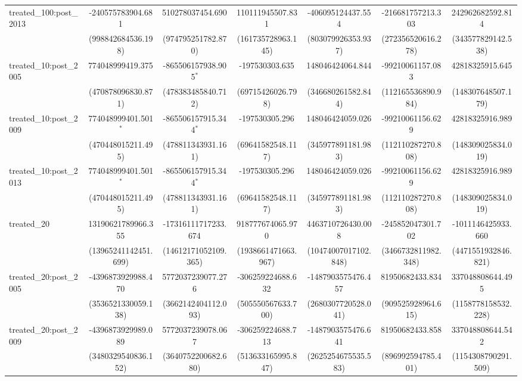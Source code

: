 \begin{table}[!htbp]
\begin{tabular}{@{\extracolsep{5pt}}lcccccc}
 treated_100:post_2013 & -240575783904.681$^{}$ & 510278037454.690$^{}$ & 110111945507.831$^{}$ & -406095124437.554$^{}$ & -216681757213.303$^{}$ & 242962682592.814$^{}$ \\
  & (998842684536.198) & (974795251782.870) & (161735728963.145) & (803079926353.937) & (272356520616.278) & (343577829142.538) \\
 treated_10:post_2005 & 774048999419.375$^{}$ & -865506157938.905$^{*}$ & -197530303.635$^{}$ & 148046424064.844$^{}$ & -99210061157.083$^{}$ & 42818325915.645$^{}$ \\
  & (470878096830.871) & (478383485840.712) & (69715426026.798) & (346680261582.844) & (112165536890.984) & (148307648507.179) \\
 treated_10:post_2009 & 774048999401.501$^{*}$ & -865506157915.344$^{*}$ & -197530305.296$^{}$ & 148046424059.026$^{}$ & -99210061156.629$^{}$ & 42818325916.989$^{}$ \\
  & (470448015211.495) & (478811343931.161) & (69641582548.117) & (345977891181.983) & (112110287270.808) & (148309025834.019) \\
 treated_10:post_2013 & 774048999401.501$^{*}$ & -865506157915.344$^{*}$ & -197530305.296$^{}$ & 148046424059.026$^{}$ & -99210061156.629$^{}$ & 42818325916.989$^{}$ \\
  & (470448015211.495) & (478811343931.161) & (69641582548.117) & (345977891181.983) & (112110287270.808) & (148309025834.019) \\
 treated_20 & 13190621789966.355$^{}$ & -17316111717233.674$^{}$ & 918777674065.970$^{}$ & 4463710726430.008$^{}$ & -245852047301.702$^{}$ & -1011146425933.660$^{}$ \\
  & (13965241142451.699) & (14612171052109.365) & (1938661471663.967) & (10474007017102.848) & (3466732811982.348) & (4471551932846.821) \\
 treated_20:post_2005 & -4396873929988.470$^{}$ & 5772037239077.276$^{}$ & -306259224688.632$^{}$ & -1487903575476.457$^{}$ & 81950682433.834$^{}$ & 337048808644.495$^{}$ \\
  & (3536521330059.138) & (3662142404112.093) & (505550567633.700) & (2680307720528.041) & (909525928964.615) & (1158778158532.228) \\
 treated_20:post_2009 & -4396873929989.089$^{}$ & 5772037239078.067$^{}$ & -306259224688.713$^{}$ & -1487903575476.641$^{}$ & 81950682433.858$^{}$ & 337048808644.542$^{}$ \\
  & (3480329540836.152) & (3640752200682.680) & (513633165995.847) & (2625254675535.583) & (896992594785.401) & (1154308790291.509) \\

\end{tabular}
\end{table}
